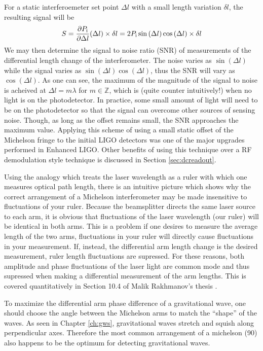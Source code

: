 For a static interferoemeter set point $\Delta l$ with a small length variation $\delta l$, the resulting signal will be
\begin{equation}
S=\frac{\partial P_{\rm i}}{\partial \Delta l}(\Delta l) \times \delta l = 2P_{\rm i}\sin{(\Delta l)}\cos{(\Delta l)}\times \delta l
\end{equation}
We may then determine the signal to noise ratio (SNR) of measurements of the differential length change of the interferometer. %
The noise varies as $\sin(\Delta l)$ while the signal varies as $\sin(\Delta l)\cos(\Delta l)$, thus the SNR will vary as $\cos(\Delta l)$. %
As one can see, the maximum of the magnitude of the signal to noise is acheived at $\Delta l = m \lambda$ for $m \in \mathbb{Z}$, which is (quite counter intuitively!) when no light is on the photodetector. %
In practice, some small amount of light will need to be on the photodetector so that the signal can overcome other sources of sensing noise. %
Though, as long as the offset remains small, the SNR approaches the maximum value. %
Applying this scheme of using a small static offset of the Michelson fringe to the initial LIGO detectors was one of the major upgrades performed in Enhanced LIGO. %
Other benefits of using this technique over a RF demodulation style technique is discussed in Section \ref{sec:dcreadout}.

Using the analogy which treats the laser wavelength as a ruler with which one measures optical path length, there is an intuitive picture which shows why the correct arrangement of a Michelson interferometer may be made insensitive to fluctuations of your ruler. %
Because the beamsplitter directs the same laser source to each arm, it is obvious that fluctuations of the laser wavelength (our ruler) will be identical in both arms. %
This is a problem if one desires to measure the average length of the two arms, fluctuations in your ruler will directly cause fluctuations in your measurement. %
If, instead, the differential arm length change is the desired measurement, ruler length fluctuations are supressed. %
For these reasons, both amplitude and phase fluctuations of the laser light are common mode and thus supressed when making a differential measurement of the arm lengths. %
This is covered quantitatively in Section 10.4 of Malik Rakhmanov's thesis \cite{Rakhmanov}.

To maximize the differential arm phase difference of a gravitational wave, one should choose the angle between the Michelson arms to match the ``shape'' %
of the waves. %
As seen in Chapter \ref{ch:gws}, gravitational waves stretch and squish along perpendicular axes. %
Therefore the most common arrangement of a michelson (90\degrees{}) also happens to be the optimum for detecting gravitational waves.

